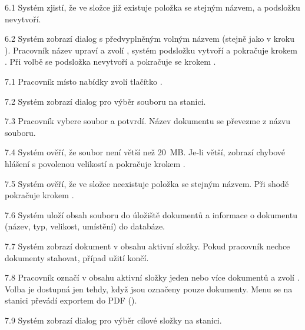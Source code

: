 \begin{ucalt}
  \item[6.1]\label{uc:02:6.1} Systém zjistí, že ve složce již existuje položka se stejným názvem, a podsložku nevytvoří.
  \item[6.2]\label{uc:02:6.2} Systém zobrazí dialog s předvyplněným volným názvem (stejně jako v kroku ). Pracovník název upraví a zvolí , systém podsložku vytvoří a pokračuje krokem . Při volbě  se podsložka nevytvoří a pokračuje se krokem .
\end{ucalt}

\begin{ucalt}
  \item[7.1]\label{uc:02:7.1} Pracovník místo nabídky  zvolí tlačítko .
  \item[7.2]\label{uc:02:7.2} Systém zobrazí dialog pro výběr souboru na stanici.
  \item[7.3]\label{uc:02:7.3} Pracovník vybere soubor a potvrdí. Název dokumentu se převezme z názvu souboru.
  \item[7.4]\label{uc:02:7.4} Systém ověří, že soubor není větší než 20~MB. Je-li větší, zobrazí chybové hlášení s povolenou velikostí a pokračuje krokem . 
  \item[7.5]\label{uc:02:7.5} Systém ověří, že ve složce neexistuje položka se stejným názvem. Při shodě pokračuje krokem .
  \item[7.6]\label{uc:02:7.6} Systém uloží obsah souboru do úložiště dokumentů a informace o dokumentu (název, typ, velikost, umístění) do databáze.
  \item[7.7]\label{uc:02:7.7} Systém zobrazí dokument v obsahu aktivní složky. Pokud pracovník nechce dokumenty stahovat, případ užití končí.
  \item[7.8]\label{uc:02:7.8} Pracovník označí v obsahu aktivní složky jeden nebo více dokumentů a zvolí . Volba je dostupná jen tehdy, když jsou označeny pouze dokumenty. Menu se na stanici převádí exportem do PDF ().
  \item[7.9]\label{uc:02:7.9} Systém zobrazí dialog pro výběr cílové složky na stanici.

\end{ucalt}
